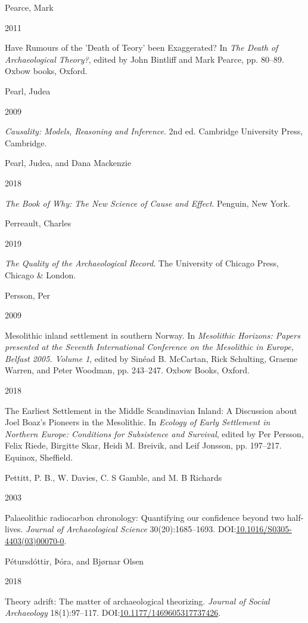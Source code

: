 \documentclass[
  12pt,
  a4paper,
  oneside]{book}
\newlength{\cslhangindent}
\newlength{\csllabelwidth}
\newlength{\cslentryspacingunit} %
\newenvironment{CSLReferences}[2] %
 {%
  \setlength{\parindent}{0pt}
  \ifodd #1
  \let\oldpar\par
  \def\par{\hangindent=\cslhangindent\oldpar}
  \fi
  \setlength{\parskip}{#2\cslentryspacingunit}
 }%
 {}
\newcommand{\CSLBlock}[1]{#1\hfill\break}
\newcommand{\CSLLeftMargin}[1]{\parbox[t]{\csllabelwidth}{#1}}
\newcommand{\CSLRightInline}[1]{\parbox[t]{\linewidth - \csllabelwidth}{#1}\break}
\begin{document}
\begin{CSLReferences}{0}{0}
\leavevmode{}%
\CSLBlock{Pearce, Mark}
\CSLLeftMargin{ 2011}%
\CSLRightInline{{Have Rumours of the 'Death of Teory' been Exaggerated?} In \emph{{The Death of Archaeological Theory?}}, edited by John Bintliff and Mark Pearce, pp. 80--89. Oxbow books, Oxford.}

\leavevmode{}%
\CSLBlock{Pearl, Judea}
\CSLLeftMargin{ 2009}%
\CSLRightInline{\emph{{Causality: Models, Reasoning and Inference}}. 2nd ed. Cambridge University Press, Cambridge.}

\leavevmode{}%
\CSLBlock{Pearl, Judea, and Dana Mackenzie}
\CSLLeftMargin{ 2018}%
\CSLRightInline{\emph{{The Book of Why: The New Science of Cause and Effect}}. Penguin, New York.}

\leavevmode{}%
\CSLBlock{Perreault, Charles}
\CSLLeftMargin{ 2019}%
\CSLRightInline{\emph{{The Quality of the Archaeological Record}}. The University of Chicago Press, Chicago \& London.}

\leavevmode{}%
\CSLBlock{Persson, Per}
\CSLLeftMargin{ 2009}%
\CSLRightInline{{Mesolithic inland settlement in southern Norway}. In \emph{{Mesolithic Horizons: Papers presented at the Seventh International Conference on the Mesolithic in Europe, Belfast 2005. Volume 1}}, edited by Sinéad B. McCartan, Rick Schulting, Graeme Warren, and Peter Woodman, pp. 243--247. Oxbow Books, Oxford.}

\leavevmode{}%
\CSLLeftMargin{ 2018 }%
\CSLRightInline{{The Earliest Settlement in the Middle Scandinavian Inland: A Discussion about Joel Boaz's Pioneers in the Mesolithic}. In \emph{{Ecology of Early Settlement in Northern Europe: Conditions for Subsistence and Survival}}, edited by Per Persson, Felix Riede, Birgitte Skar, Heidi M. Breivik, and Leif Jonsson, pp. 197--217. Equinox, Sheffield.}

\leavevmode{}%
\CSLBlock{Pettitt, P. B., W. Davies, C. S Gamble, and M. B Richards}
\CSLLeftMargin{ 2003}%
\CSLRightInline{Palaeolithic radiocarbon chronology: Quantifying our confidence beyond two half-lives. \emph{Journal of Archaeological Science} 30(20):1685--1693. DOI:\href{https://doi.org/10.1016/S0305-4403(03)00070-0}{10.1016/S0305-4403(03)00070-0}.}

\leavevmode{}%
\CSLBlock{Pétursdóttir, Þóra, and Bjørnar Olsen}
\CSLLeftMargin{ 2018}%
\CSLRightInline{{Theory adrift: The matter of archaeological theorizing}. \emph{Journal of Social Archaeology} 18(1):97--117. DOI:\href{https://doi.org/10.1177/1469605317737426}{10.1177/1469605317737426}.}


\end{CSLReferences}
\end{document}
